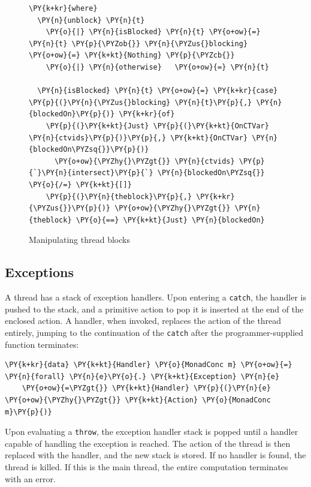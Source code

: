 \begin{figure}[t]
\begin{Verbatim}[commandchars=\\\{\}]
  \PY{k+kr}{where}
  \PY{n}{unblock} \PY{n}{t}
    \PY{o}{|} \PY{n}{isBlocked} \PY{n}{t} \PY{o+ow}{=} \PY{n}{t} \PY{p}{\PYZob{}} \PY{n}{\PYZus{}blocking} \PY{o+ow}{=} \PY{k+kt}{Nothing} \PY{p}{\PYZcb{}}
    \PY{o}{|} \PY{n}{otherwise}   \PY{o+ow}{=} \PY{n}{t}

  \PY{n}{isBlocked} \PY{n}{t} \PY{o+ow}{=} \PY{k+kr}{case} \PY{p}{(}\PY{n}{\PYZus{}blocking} \PY{n}{t}\PY{p}{,} \PY{n}{blockedOn}\PY{p}{)} \PY{k+kr}{of}
    \PY{p}{(}\PY{k+kt}{Just} \PY{p}{(}\PY{k+kt}{OnCTVar} \PY{n}{ctvids}\PY{p}{)}\PY{p}{,} \PY{k+kt}{OnCTVar} \PY{n}{blockedOn\PYZsq{}}\PY{p}{)}
      \PY{o+ow}{\PYZhy{}\PYZgt{}} \PY{n}{ctvids} \PY{p}{`}\PY{n}{intersect}\PY{p}{`} \PY{n}{blockedOn\PYZsq{}} \PY{o}{/=} \PY{k+kt}{[]}
    \PY{p}{(}\PY{n}{theblock}\PY{p}{,} \PY{k+kr}{\PYZus{}}\PY{p}{)} \PY{o+ow}{\PYZhy{}\PYZgt{}} \PY{n}{theblock} \PY{o}{==} \PY{k+kt}{Just} \PY{n}{blockedOn}
\end{Verbatim}
  \caption{Manipulating thread blocks}
  \label{fig:dejafu-impl-blocks}
\end{figure}

\subsection*{Exceptions}
\label{sec:dejafu-impl-excs}

A thread has a stack of exception handlers. Upon entering a
\texttt{catch}, the handler is pushed to the stack, and a primitive
action to pop it is inserted at the end of the enclosed action. A
handler, when invoked, replaces the action of the thread entirely,
jumping to the continuation of the \texttt{catch} after the
programmer-supplied function terminates:


\begin{Verbatim}[commandchars=\\\{\}]
\PY{k+kr}{data} \PY{k+kt}{Handler} \PY{o}{MonadConc m} \PY{o+ow}{=} \PY{n}{forall} \PY{n}{e}\PY{o}{.} \PY{k+kt}{Exception} \PY{n}{e}
    \PY{o+ow}{=\PYZgt{}} \PY{k+kt}{Handler} \PY{p}{(}\PY{n}{e} \PY{o+ow}{\PYZhy{}\PYZgt{}} \PY{k+kt}{Action} \PY{o}{MonadConc m}\PY{p}{)}
\end{Verbatim}

Upon evaluating a \texttt{throw}, the exception handler stack is
popped until a handler capable of handling the exception is
reached. The action of the thread is then replaced with the handler,
and the new stack is stored. If no handler is found, the thread is
killed. If this is the main thread, the entire computation terminates
with an error.

